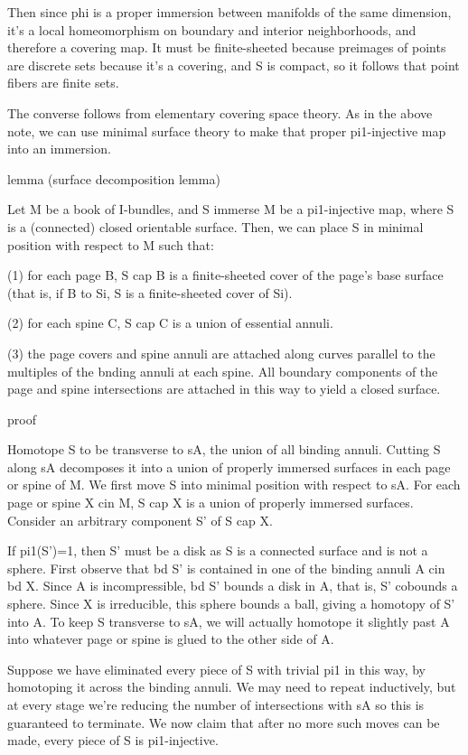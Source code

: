 Then since phi is a proper immersion between manifolds of the same dimension,
it's a local homeomorphism on boundary and interior neighborhoods, and
therefore a covering map. It must be finite-sheeted because preimages of points
are discrete sets because it's a covering, and S is compact, so it follows that
point fibers are finite sets.

The converse follows from elementary covering space theory. As in the above
note, we can use minimal surface theory to make that proper pi1-injective map
into an immersion.

lemma (surface decomposition lemma)

Let M be a book of I-bundles, and S immerse M be a pi1-injective map, where
S is a (connected) closed orientable surface.  Then, we can place S in minimal
position with respect to M such that:

(1) for each page B, S cap B is a finite-sheeted cover of the page's base
surface (that is, if B to Si, S is a finite-sheeted cover of Si).

(2) for each spine C, S cap C is a union of essential annuli.

(3) the page covers and spine annuli are attached along curves parallel to the
multiples of the bnding annuli at each spine. All boundary components of the
page and spine intersections are attached in this way to yield a closed
surface.

proof

Homotope S to be transverse to sA, the union of all binding annuli. Cutting
S along sA decomposes it into a union of properly immersed surfaces in each
page or spine of M. We first move S into minimal position with respect to sA.
For each page or spine X cin M, S cap X is a union of properly immersed
surfaces. Consider an arbitrary component S' of S cap X.

If pi1(S')=1, then S' must be a disk as S is a connected surface and is not
a sphere. First observe that bd S' is contained in one of the binding annuli
A cin bd X. Since A is incompressible, bd S' bounds a disk in A, that is, S'
cobounds a sphere. Since X is irreducible, this sphere bounds a ball, giving
a homotopy of S' into A. To keep S transverse to sA, we will actually homotope
it slightly past A into whatever page or spine is glued to the other side of A.

Suppose we have eliminated every piece of S with trivial pi1 in this way, by
homotoping it across the binding annuli. We may need to repeat inductively, but
at every stage we're reducing the number of intersections with sA so this is
guaranteed to terminate. We now claim that after no more such moves can be
made, every piece of S is pi1-injective.

